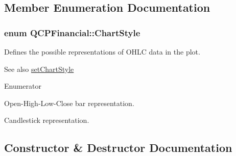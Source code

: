 \subsection{Member Enumeration Documentation}
\hypertarget{class_q_c_p_financial_a0f800e21ee98d646dfc6f8f89d10ebfb}{}
\subsubsection[{Chart\+Style}]{\setlength{\rightskip}{0pt plus 5cm}enum {\bf Q\+C\+P\+Financial\+::\+Chart\+Style}}\label{class_q_c_p_financial_a0f800e21ee98d646dfc6f8f89d10ebfb}
Defines the possible representations of O\+H\+L\+C data in the plot.

\begin{DoxySeeAlso}{See also}
\hyperlink{class_q_c_p_financial_a5a59175d36279d71596e64d7bb65596f}{set\+Chart\+Style} 
\end{DoxySeeAlso}
\begin{Desc}
\item[Enumerator]\par
\begin{description}
\item[{\em 
\hypertarget{class_q_c_p_financial_a0f800e21ee98d646dfc6f8f89d10ebfba3a516016c9298d3e95dd82aa203c4390}{}cs\+Ohlc\label{class_q_c_p_financial_a0f800e21ee98d646dfc6f8f89d10ebfba3a516016c9298d3e95dd82aa203c4390}
}]Open-\/\+High-\/\+Low-\/\+Close bar representation. \item[{\em 
\hypertarget{class_q_c_p_financial_a0f800e21ee98d646dfc6f8f89d10ebfbac803cbd39f26e3f206bcc7028679e62f}{}cs\+Candlestick\label{class_q_c_p_financial_a0f800e21ee98d646dfc6f8f89d10ebfbac803cbd39f26e3f206bcc7028679e62f}
}]Candlestick representation. \end{description}
\end{Desc}


\subsection{Constructor \& Destructor Documentation}
\hypertarget{class_q_c_p_financial_a4702d5248feeb9d1ec6e3ce725b10b32}{}
